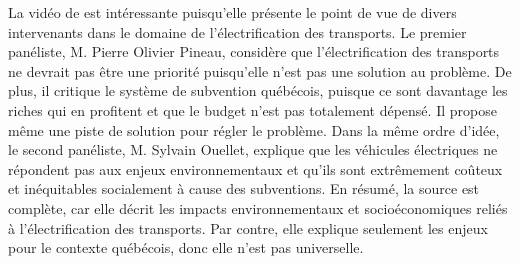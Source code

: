 La vidéo de   est intéressante puisqu’elle présente le point de vue de divers intervenants dans le domaine de l’électrification des transports. Le premier panéliste, M. Pierre Olivier Pineau, considère que l’électrification des transports ne devrait pas être une priorité puisqu’elle n’est pas une solution au problème. De plus, il critique le système de subvention québécois, puisque ce sont davantage les riches qui en profitent et que le budget n’est pas totalement dépensé. Il propose même une piste de solution pour régler le problème. Dans la même ordre d’idée, le second panéliste, M. Sylvain Ouellet, explique que les véhicules électriques ne répondent pas aux enjeux environnementaux et qu’ils sont extrêmement coûteux et inéquitables socialement à cause des subventions. En résumé, la source est complète, car elle décrit les impacts environnementaux et socioéconomiques reliés à l’électrification des transports. Par contre, elle explique seulement les enjeux pour le contexte québécois, donc elle n’est pas universelle.
